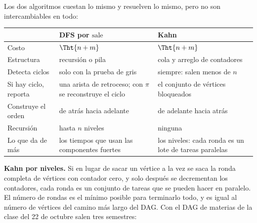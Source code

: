 \documentclass[11pt,letterpaper]{article}
\begin{document}
Los dos algoritmos cuestan lo mismo y resuelven lo mismo, pero no son
intercambiables en todo:

\begin{center}
\small
\begin{tabular}{>{\raggedright\arraybackslash}p{3.1cm}
                >{\raggedright\arraybackslash}p{5.6cm}
                >{\raggedright\arraybackslash}p{5.6cm}}
  \toprule
  & \textbf{DFS por $\text{sale}$} & \textbf{Kahn} \\
  \midrule
  Costo & $\Tht{n + m}$ & $\Tht{n + m}$ \\
  Estructura & recursión o pila & cola y arreglo de contadores \\
  Detecta ciclos & solo con la prueba de gris & siempre: salen menos
    de $n$ \\
  Si hay ciclo, reporta & una arista de retroceso; con $\pi$ se
    reconstruye el ciclo & el conjunto de vértices bloqueados \\
  Construye el orden & de atrás hacia adelante & de adelante hacia
    atrás \\
  Recursión & hasta $n$ niveles & ninguna \\
  Lo que da de más & los tiempos que usan las componentes fuertes &
    los niveles: cada ronda es un lote de tareas paralelas \\
  \bottomrule
\end{tabular}
\end{center}

\textbf{Kahn por niveles.} Si en lugar de sacar un vértice a la vez se
saca la ronda completa de vértices con contador cero, y solo después
se decrementan los contadores, cada ronda es un conjunto de tareas que
se pueden hacer en paralelo. El número de rondas es el mínimo posible
para terminarlo todo, y es igual al número de vértices del camino más
largo del DAG. Con el DAG de materias de la clase del 22 de octubre
salen tres semestres:

\begin{center}
\end{center}
\end{document}
